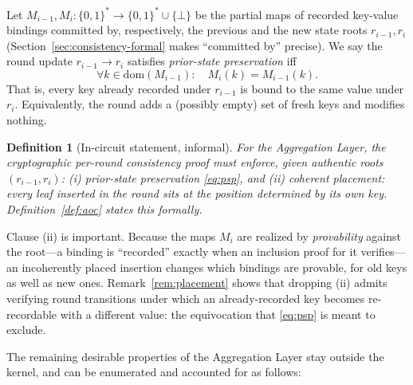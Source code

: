 \documentclass[11pt]{article}
\newtheorem{definition}{Definition}
\begin{document}
Let $M_{i-1}, M_i \colon \{0,1\}^* \to \{0,1\}^* \cup \{\bot\}$ be the partial maps of recorded key-value bindings committed by, respectively, the previous and the new state roots $r_{i-1}, r_i$ (Section~\ref{sec:consistency-formal} makes ``committed by'' precise). We say the round update $r_{i-1} \to r_i$ satisfies \emph{prior-state preservation} iff
\begin{equation}
  \forall k \in \mathrm{dom}(M_{i-1})\colon\quad M_i(k) = M_{i-1}(k).
  \label{eq:psp}
\end{equation}
That is, every key already recorded under $r_{i-1}$ is bound to the same value under $r_i$. Equivalently, the round adds a (possibly empty) set of fresh keys and modifies nothing.

\begin{definition}[In-circuit statement, informal]
\label{def:minimal}
For the Aggregation Layer, the cryptographic per-round consistency proof must enforce, given authentic roots $(r_{i-1}, r_i)$: (i) prior-state preservation \eqref{eq:psp}, and (ii) \emph{coherent placement}: every leaf inserted in the round sits at the position determined by its own key. Definition~\ref{def:aoc} states this formally.
\end{definition}

Clause (ii) is important. Because the maps $M_i$ are realized by \emph{provability} against the root---a binding is ``recorded'' exactly when an inclusion proof for it verifies---an incoherently placed insertion changes which bindings are provable, for old keys as well as new ones. Remark~\ref{rem:placement} shows that dropping (ii) admits verifying round transitions under which an already-recorded key becomes re-recordable with a different value: the equivocation that \eqref{eq:psp} is meant to exclude.

The remaining desirable properties of the Aggregation Layer stay outside the kernel, and can be enumerated and accounted for as follows:
\end{document}
